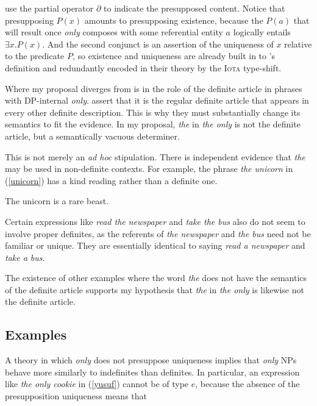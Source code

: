 \citeauthor{cb2015} use the partial operator $\partial$ to indicate the presupposed content. Notice that presupposing $P(x)$ amounts to presupposing existence, because the $P(a)$ that will result once \textit{only} composes with some referential entity $a$ logically entails $\exists x . P(x)$. And the second conjunct is an assertion of the uniqueness of $x$ relative to the predicate $P$, so existence and uniqueness are already built in to \citeauthor{cb2015}'s definition and redundantly encoded in their theory by the \textsc{Iota} type-shift.

Where my proposal diverges from  is in the role of the definite article in phrases with DP-internal \textit{only}. \citeauthor{cb2015} assert that it is the regular definite article that appears in every other definite description. This is why they must substantially change its semantics to fit the evidence. In my proposal, \textit{the} in \textit{the only} is not the definite article, but a semantically vacuous determiner.

This is not merely an \textit{ad hoc} stipulation. There is independent evidence that \textit{the} may be used in non-definite contexts. For example, the phrase \textit{the unicorn} in (\ref{unicorn}) has a kind reading rather than a definite one.

\begin{exe}
	\ex \label{unicorn} The unicorn is a rare beast.
\end{exe}

Certain expressions like \textit{read the newspaper} and \textit{take the bus} also do not seem to involve proper definites, as the referents of \textit{the newspaper} and \textit{the bus} need not be familiar or unique. They are essentially identical to saying \textit{read a newspaper} and \textit{take a bus}.

The existence of other examples where the word \textit{the} does not have the semantics of the definite article supports my hypothesis that \textit{the} in \textit{the only} is likewise not the definite article.

\subsection{Examples}
A theory in which \textit{only} does not presuppose uniqueness implies that \textit{only} NPs behave more similarly to indefinites than definites. In particular, an expression like \textit{the only cookie} in (\ref{yusuf}) cannot be of type $e$, because the absence of the presupposition uniqueness means that

